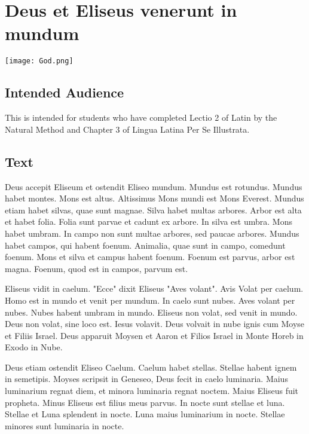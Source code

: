 \chapter{Deus et Eliseus venerunt in mundum}
\begin{center}
\texttt{[image: God.png]}
\end{center}

\section{Intended Audience}
This is intended for students who have completed Lectio 2 of Latin by the Natural Method and Chapter 3 of Lingua Latina Per Se Illustrata.

\section{Text}
Deus accepit Eliseum et ostendit Eliseo mundum. Mundus est rotundus. Mundus habet montes. Mons est altus. Altissimus Mons mundi est Mons Everest. Mundus etiam habet silvas, quae sunt magnae. Silva habet multas arbores. Arbor est alta et habet folia. Folia sunt parvae et cadunt ex arbore. In silva est umbra. Mons habet umbram. In campo non sunt multae arbores, sed paucae arbores. Mundus habet campos, qui habent foenum. Animalia, quae sunt in campo, comedunt foenum. Mons et silva et campus habent foenum. Foenum est parvus, arbor est magna. Foenum, quod est in campos, parvum est. 

Eliseus vidit in caelum. "Ecce" dixit Eliseus "Aves volant". Avis Volat per caelum. Homo est in mundo et venit per mundum. In caelo sunt nubes. Aves volant per nubes. Nubes habent umbram in mundo. Eliseus non volat, sed venit in mundo. Deus non volat, sine loco est. Iesus volavit. Deus volvait in nube ignis cum Moyse et Filiis Israel. Deus apparuit Moysen et Aaron et Filios Israel in Monte Horeb in Exodo in Nube. 

Deus etiam ostendit Eliseo Caelum. Caelum habet stellas. Stellae habent ignem in semetipis.  Moyses scripsit in Geneseo, Deus fecit in caelo luminaria. Maius luminarium regnat diem, et minora luminaria regnat noctem. Maius Eliseus fuit propheta. Minus Eliseus est filius meus parvus. In nocte sunt stellae et luna. Stellae et Luna splendent in nocte. Luna maius luminarium in nocte. Stellae minores sunt luminaria in nocte. 